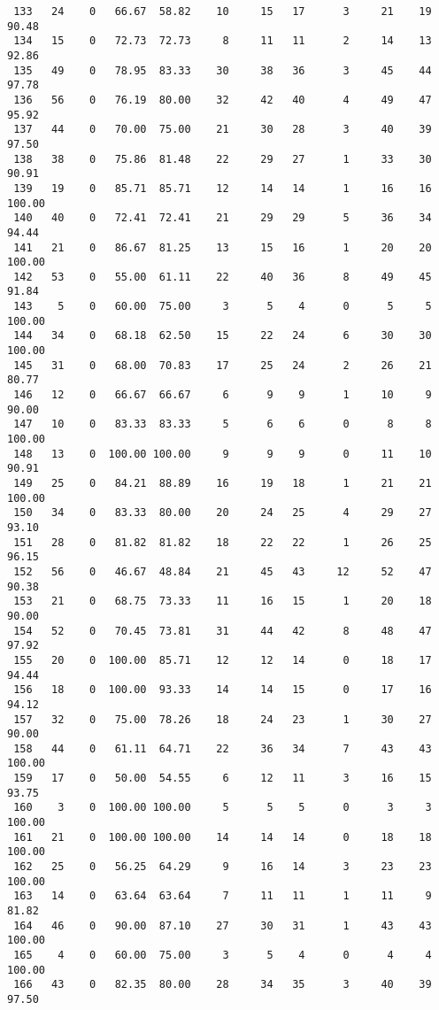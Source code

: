 \begin{verbatim}
 133   24    0   66.67  58.82    10     15   17      3     21    19    90.48
 134   15    0   72.73  72.73     8     11   11      2     14    13    92.86
 135   49    0   78.95  83.33    30     38   36      3     45    44    97.78
 136   56    0   76.19  80.00    32     42   40      4     49    47    95.92
 137   44    0   70.00  75.00    21     30   28      3     40    39    97.50
 138   38    0   75.86  81.48    22     29   27      1     33    30    90.91
 139   19    0   85.71  85.71    12     14   14      1     16    16   100.00
 140   40    0   72.41  72.41    21     29   29      5     36    34    94.44
 141   21    0   86.67  81.25    13     15   16      1     20    20   100.00
 142   53    0   55.00  61.11    22     40   36      8     49    45    91.84
 143    5    0   60.00  75.00     3      5    4      0      5     5   100.00
 144   34    0   68.18  62.50    15     22   24      6     30    30   100.00
 145   31    0   68.00  70.83    17     25   24      2     26    21    80.77
 146   12    0   66.67  66.67     6      9    9      1     10     9    90.00
 147   10    0   83.33  83.33     5      6    6      0      8     8   100.00
 148   13    0  100.00 100.00     9      9    9      0     11    10    90.91
 149   25    0   84.21  88.89    16     19   18      1     21    21   100.00
 150   34    0   83.33  80.00    20     24   25      4     29    27    93.10
 151   28    0   81.82  81.82    18     22   22      1     26    25    96.15
 152   56    0   46.67  48.84    21     45   43     12     52    47    90.38
 153   21    0   68.75  73.33    11     16   15      1     20    18    90.00
 154   52    0   70.45  73.81    31     44   42      8     48    47    97.92
 155   20    0  100.00  85.71    12     12   14      0     18    17    94.44
 156   18    0  100.00  93.33    14     14   15      0     17    16    94.12
 157   32    0   75.00  78.26    18     24   23      1     30    27    90.00
 158   44    0   61.11  64.71    22     36   34      7     43    43   100.00
 159   17    0   50.00  54.55     6     12   11      3     16    15    93.75
 160    3    0  100.00 100.00     5      5    5      0      3     3   100.00
 161   21    0  100.00 100.00    14     14   14      0     18    18   100.00
 162   25    0   56.25  64.29     9     16   14      3     23    23   100.00
 163   14    0   63.64  63.64     7     11   11      1     11     9    81.82
 164   46    0   90.00  87.10    27     30   31      1     43    43   100.00
 165    4    0   60.00  75.00     3      5    4      0      4     4   100.00
 166   43    0   82.35  80.00    28     34   35      3     40    39    97.50

\end{verbatim}
